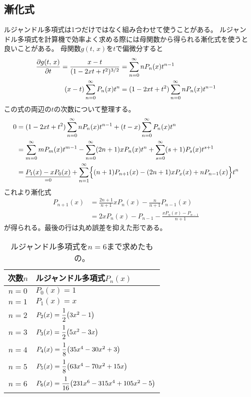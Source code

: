 \documentclass[../../master.tex]{subfiles}
\begin{document}
\subsection{漸化式}
ルジャンドル多項式は1つだけではなく組み合わせて使うことがある。
ルジャンドル多項式を計算機で効率よく求める際には母関数から得られる漸化式を使うと良いことがある。
母関数\(g(t,\,x)\)を\(t\)で偏微分すると
\begin{align}
	\pdv{g(t,\,x)}{t} = \frac{x-t}{(1-2xt+t^2)^{3/2}} & = \sum_{n=0}^{\infty} nP_n(x)t^{n-1}            \\
	(x-t)\sum_{n=0}^{\infty} P_n(x) t^n               & = (1-2xt+t^2)\sum_{n=0}^{\infty} nP_n(x)t^{n-1} \\
\end{align}
この式の両辺の\(t\)の次数について整理する。
\begin{align}
	0 & = (1-2xt+t^2)\sum_{n=0}^{\infty} nP_n(x)t^{n-1} +(t-x)\sum_{n=0}^{\infty} P_n(x) t^n \\
	  & = \sum_{m=0}^{\infty} mP_m(x)t^{m-1}
	- \sum_{n=0}^{\infty}(2n+1)xP_n(x)t^n
	+ \sum_{s=0}^{\infty} (s+1)P_s(x)t^{s+1}                                                 \\
	  & = \underset{=0}{\underline{P_1(x) -xP_0(x)}}+
	\sum_{n=1}^{\infty} \Bigl\{
	(n+1)P_{n+1}(x) - (2n+1)xP_x(x) + nP_{n-1}(x)
	\Bigr\}t^n
\end{align}
これより漸化式
\begin{align}
	P_{n+1}(x) & = \frac{2n+1}{n+1}xP_n(x)-\frac{n}{n+1}P_{n-1}(x) \label{eq:legendre_recurrece1} \\
	           & = 2xP_n(x)-P_{n-1} -\frac{xP_n(x)-P_{n-1}}{n+1}
\end{align}
が得られる。最後の行は丸め誤差を抑えた形である。

\begin{table}[htb]
	\centering
	\caption{ルジャンドル多項式を\(n=6\)まで求めたもの。}
	\begin{tabular}{cl}
		\hline
		次数\(n\) & ルジャンドル多項式\(P_n(x)\)                                   \\
		\hline \hline
		\(n=0\) & \(P_0(x)= 1\)                                         \\
		\(n=1\) & \(P_1(x)= x\)                                         \\
		\(n=2\) & \(P_2(x)= \dfrac{1}{2}\qty(3x^2-1)\)
		\rule[-4.5mm]{0mm}{9mm}                                         \\
		\(n=3\) & \(P_3(x)= \dfrac{1}{2}\qty(5x^2-3x)\)
		\rule[-4.5mm]{0mm}{9mm}                                         \\
		\(n=4\) & \(P_4(x)= \dfrac{1}{8}\qty(35x^4-30x^2+3)\)
		\rule[-4.5mm]{0mm}{9mm}                                         \\
		\(n=5\) & \(P_5(x)= \dfrac{1}{8}\qty(63x^4-70x^2+15x)\)
		\rule[-4.5mm]{0mm}{9mm}                                         \\
		\(n=6\) & \(P_6(x)= \dfrac{1}{16}\qty(231x^6-315x^4+105x^2-5)\)
		\rule[-4.5mm]{0mm}{9mm}                                         \\
		\hline
	\end{tabular}
\end{table}
\end{document}
